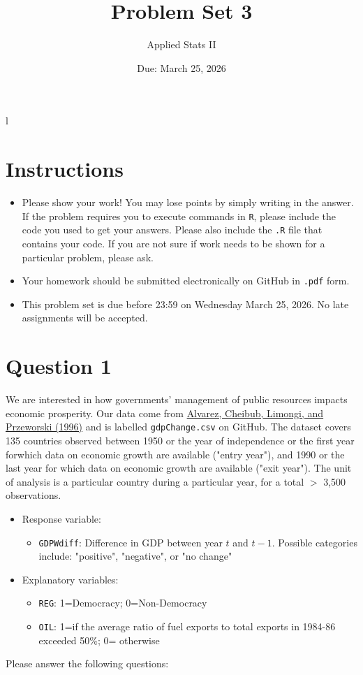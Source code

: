 l\documentclass[12pt,letterpaper]{article}
\title{Problem Set 3}
\date{Due: March 25, 2026}
\author{Applied Stats II}
\begin{document}
	\maketitle
	\section*{Instructions}
	\begin{itemize}
	\item Please show your work! You may lose points by simply writing in the answer. If the problem requires you to execute commands in \texttt{R}, please include the code you used to get your answers. Please also include the \texttt{.R} file that contains your code. If you are not sure if work needs to be shown for a particular problem, please ask.
\item Your homework should be submitted electronically on GitHub in \texttt{.pdf} form.
\item This problem set is due before 23:59 on Wednesday March 25, 2026. No late assignments will be accepted.
	\end{itemize}

	\vspace{.25cm}
\section*{Question 1}
\vspace{.25cm}
\noindent We are interested in how governments' management of public resources impacts economic prosperity. Our data come from \href{https://www.researchgate.net/profile/Adam_Przeworski/publication/240357392_Classifying_Political_Regimes/links/0deec532194849aefa000000/Classifying-Political-Regimes.pdf}{Alvarez, Cheibub, Limongi, and Przeworski (1996)} and is labelled \texttt{gdpChange.csv} on GitHub. The dataset covers 135 countries observed between 1950 or the year of independence or the first year forwhich data on economic growth are available ("entry year"), and 1990 or the last year for which data on economic growth are available ("exit year"). The unit of analysis is a particular country during a particular year, for a total $>$ 3,500 observations. 

\begin{itemize}
	\item
	Response variable: 
	\begin{itemize}
		\item \texttt{GDPWdiff}: Difference in GDP between year $t$ and $t-1$. Possible categories include: "positive", "negative", or "no change"
	\end{itemize}
	\item
	Explanatory variables: 
	\begin{itemize}
		\item
		\texttt{REG}: 1=Democracy; 0=Non-Democracy
		\item
		\texttt{OIL}: 1=if the average ratio of fuel exports to total exports in 1984-86 exceeded 50\%; 0= otherwise
	\end{itemize}
	
\end{itemize}
\newpage
\noindent Please answer the following questions:
\end{document}
